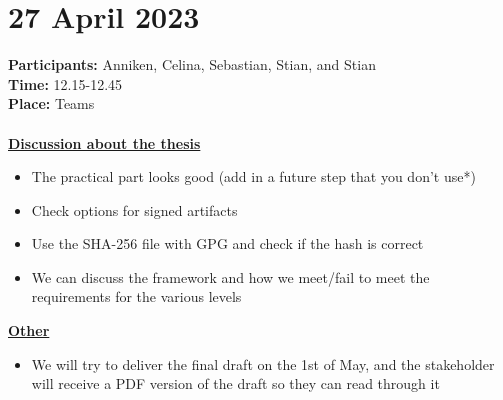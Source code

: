 \section{27 April 2023}
\textbf{Participants:} Anniken, Celina, Sebastian, Stian, and Stian \\
\textbf{Time:} 12.15-12.45 \\
\textbf{Place:} Teams
\\~\\

\textbf{\underline{Discussion about the thesis}}
\begin{itemize}
    \item The practical part looks good (add in a future step that you don't use*)
    \item Check options for signed artifacts
    \item Use the SHA-256 file with GPG and check if the hash is correct
    \item We can discuss the framework and how we meet/fail to meet the requirements for the various levels
\end{itemize}

\textbf{\underline{Other}}
\begin{itemize}
\item We will try to deliver the final draft on the 1st of May, and the stakeholder will receive a PDF version of the draft so they can read through it
\end{itemize}